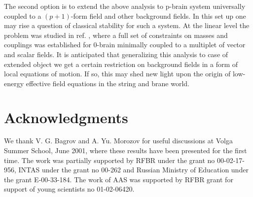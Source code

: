 \documentclass[a4paper,12pt]{article}
\begin{document}
The second option is to extend the above analysis to p-brain system
universally coupled to a $(p+1)$-form field and other background fields. In this
set up one may rise a question of classical stability for such a system. At
the linear level the problem was studied in ref. \cite{VH}, where a full set
of constraints on masses and couplings was established for $0$-brain
minimally coupled to a multiplet of vector and scalar fields. It is
anticipated that generalizing this analysis to case of extended object we
get a certain restriction on background fields in a form of local equations of
motion. If so, this may shed new light upon the origin of low-energy
effective field equations in the string and brane world.

\section*{Acknowledgments}

We thank V. G. Bagrov and A. Yu. Morozov for useful discussions at Volga
Summer School, June 2001, where these results have been presented for the
first time. The work was partially supported by RFBR under the grant no
00-02-17-956, INTAS under the grant no 00-262 and Russian Ministry of
Education under the grant E-00-33-184. The work of AAS was supported by RFBR
grant for support of young scientists no 01-02-06420.
\end{document}
